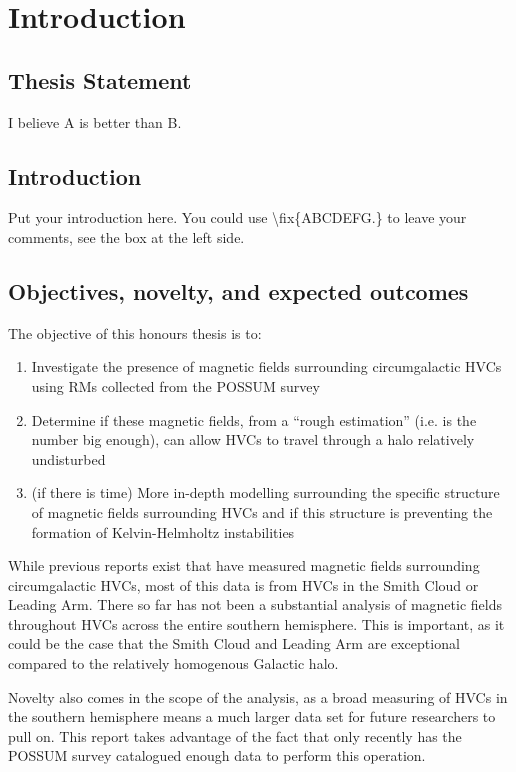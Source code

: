 \chapter{Introduction}
\label{cha:introduction}


\section{Thesis Statement}
\label{sec:thesisstatement}
I believe A is better than B.

\section{Introduction}
\label{sec:problemstatement}
Put your introduction here. You could use \textbackslash fix\{ABCDEFG.\} to
leave your comments, see the box at the left side. 

\section{Objectives, novelty, and expected outcomes}

The objective of this honours thesis is to:
\begin{enumerate}
\item Investigate the presence of magnetic fields surrounding circumgalactic HVCs using RMs collected from the POSSUM survey
\item Determine if these magnetic fields, from a “rough estimation” (i.e. is the number big enough), can allow HVCs to travel through a halo relatively undisturbed
\item (if there is time) More in-depth modelling surrounding the specific structure of magnetic fields surrounding HVCs and if this structure is preventing the formation of Kelvin-Helmholtz instabilities
\end{enumerate}

While previous reports exist that have measured magnetic fields surrounding circumgalactic HVCs, most of this data is from HVCs in the Smith Cloud or Leading Arm. There so far has not been a substantial analysis of magnetic fields throughout HVCs across the entire southern hemisphere. This is important, as it could be the case that the Smith Cloud and Leading Arm are exceptional compared to the relatively homogenous Galactic halo.

Novelty also comes in the scope of the analysis, as a broad measuring of HVCs in the southern hemisphere means a much larger data set for future researchers to pull on. This report takes advantage of the fact that only recently has the POSSUM survey catalogued enough data to perform this operation.

